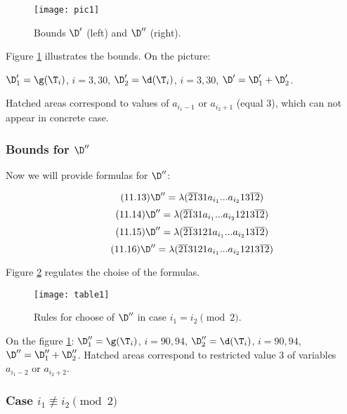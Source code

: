 \begin{figure}[p]
	\centering
	\texttt{[image: pic1]}
	\caption{Bounds $\D'$ (left) and $\D''$ (right).}
	\label{pic1}
\end{figure}

Figure \ref{pic1} illustrates the bounds. On the picture:

$\D_1' = \g(\T_i)$, $i=3,30$,
$\D_2' = \d  (\T_i)$, $i=3,30$,
$\D' = \D_1' + \D_2'$.

Hatched areas correspond to values of $a_{i_1 - 1}$ or $a_{i_2 + 1}$ (equal 3),
which can not appear in concrete case.

\subsubsection{Bounds for $\D''$}
Now we will provide formulas for $\D''$:

\begin{equation}\tag{11.13}
	\D'' = \lambda(\overline{21}31a_{i_1}... a_{i_2}13\overline{12})
\end{equation}
\begin{equation}\tag{11.14}
	\D'' = \lambda(\overline{21}31a_{i_1}... a_{i_2}1213\overline{12})
\end{equation}
\begin{equation}\tag{11.15}
	\D'' = \lambda(\overline{21}3121a_{i_1}... a_{i_2}13\overline{12})
\end{equation}
\begin{equation}\tag{11.16}
	\D'' = \lambda(\overline{21}3121a_{i_1}... a_{i_2}1213\overline{12})
\end{equation}

Figure \ref{table1} regulates the choise of the formulas.

\begin{figure}[ht]
	\centering
	\texttt{[image: table1]}
	\caption{Rules for choose of $\D''$ in case $i_1 = i_2 \pmod 2$.}
	\label{table1}
\end{figure}

On the figure \ref{pic1}:
$\D_1'' = \g(\T_i)$, $i = 90, 94$,
$\D_2'' = \d  (\T_i)$, $i = 90, 94$,
$\D'' = \D_1'' + \D_2''$.
Hatched areas correspond to restricted value 3 of variables
$a_{i_1 - 2}$ or $a_{i_2 + 2}$.

\subsubsection{Case $i_1 \not\equiv i_2 \pmod 2$}

